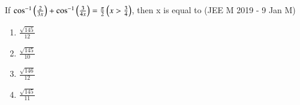 \documentclass[journal,12pt,twocolumn]{IEEEtran}
\theoremstyle{remark}
\begin{document}
\begin{enumerate}
{			If $\cos^{-1}\left(\frac{2}{3x}\right) + \cos^{-1}\left(\frac{3}{4x}\right) = \frac{\pi}{2} \left(x > \frac{3}{4}\right)$, then x is equal to \hfill (JEE M 2019 - 9 Jan M)
		\begin{multicols}{2}
		\begin{enumerate}
			\item{$\frac{\sqrt{145}}{12}$}\\
			\item{$\frac{\sqrt{145}}{10}$}
			\columnbreak
			\item{$\frac{\sqrt{146}}{12}$}\\
			\item{$\frac{\sqrt{145}}{11}$}
		\end{enumerate}
		\end{multicols}
	}
\end{enumerate}

\onecolumn
\end{document}
